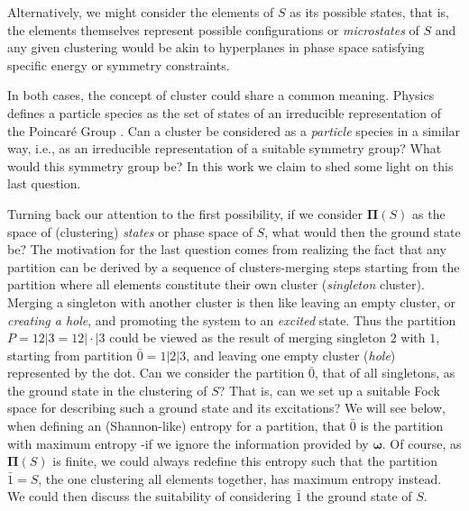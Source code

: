 \documentclass[twocolumn,aps,sort,nofootinbib]{revtex4}
\begin{document}
Alternatively, we might consider the elements
of $S$ as its possible states, that is, the elements themselves represent
possible 
configurations or 
{\sl microstates}
of $S$ and any given clustering would be akin to
hyperplanes in phase space satisfying specific energy or symmetry constraints.

In both cases, the concept of cluster could share a common meaning.
Physics defines a particle species as the set of states of an
irreducible representation of the Poincar\'e Group \cite{WeinbergQFT}. 
Can a cluster be considered as a {\sl particle} species in a similar way,
i.e., as an irreducible representation of a suitable symmetry group?
What would this symmetry group be? In this work we claim to shed some
light on this last question. 

Turning back our attention to the first possibility, if we consider $\boldsymbol{\Pi}(S)$ as 
the space of (clustering) {\sl states} or phase space  of $S$,
what would then the ground state be? The motivation for the last question
comes from realizing the fact that any partition can be derived
by a sequence of clusters-merging steps starting from the partition where
all elements constitute their own cluster ({\sl singleton} cluster). 
Merging a singleton with another cluster is then like leaving an
empty cluster, or {\sl creating a  hole}, and promoting the system
to an {\sl excited} state. Thus the partition $P=12|3=12|{\cdot}|3$ could be viewed
as the result of merging singleton $2$ with $1$,
starting from partition ${\bar 0}=1|2|3$, and leaving one 
empty cluster ({\sl hole}) represented by the dot. 
Can we consider the partition ${\bar 0}$, that of all singletons,
as the ground state in the clustering of $S$? That is, can we set
up a suitable Fock space for describing such a ground state
and its excitations? We will see below, when defining an (Shannon-like) entropy
for a partition, that ${\bar 0}$ is the partition with maximum entropy
-if we ignore the information provided by $\boldsymbol{\omega}$.
Of course, as $\boldsymbol{\Pi}(S)$ is finite, we could always redefine
this entropy such that the partition ${\bar 1}=S$, the one clustering
all elements together, has maximum entropy instead.
We could then discuss the suitability of considering ${\bar 1}$ the
ground state of $S$\cite{Ellerman09,Ellerman10}. 
\end{document}
